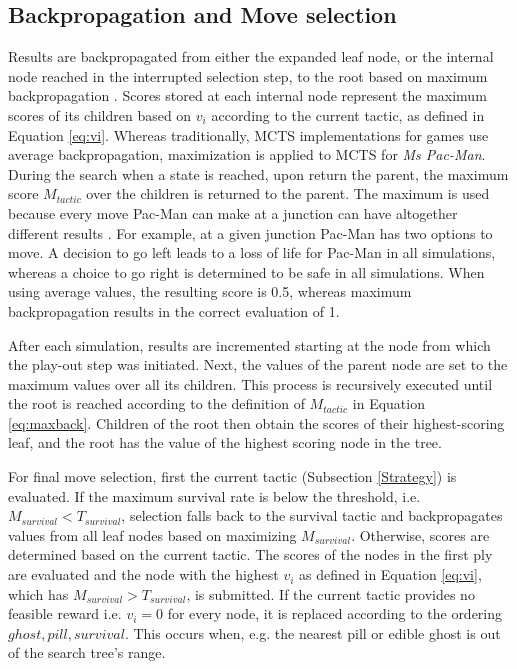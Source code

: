 \documentclass[journal]{IEEEtran}
\begin{document}
\subsection{Backpropagation and Move selection \label{sec:bpms}}

Results are backpropagated from either the expanded leaf node, or the internal node reached in the interrupted selection step, to the root based on maximum backpropagation \cite{coulom2007efficient}. Scores stored at each internal node represent the maximum scores of its children based on $v_i$ according to the current tactic, as defined in Equation \ref{eq:vi}. Whereas traditionally, MCTS implementations for games use average backpropagation, maximization is applied to MCTS for {\it{Ms Pac-Man}}. During the search when a state is reached, upon return the parent, the maximum score $M_{tactic}$ over the children is returned to the parent. The maximum is used because every move Pac-Man can make at a junction can have altogether different results \cite{ikehata2011monte}. For example, at a given junction Pac-Man has two options to move. A decision to go left leads to a loss of life for Pac-Man in all simulations, whereas a choice to go right is determined to be safe in all simulations. When using average values, the resulting score is 0.5, whereas maximum backpropagation results in the correct evaluation of 1. 

After each simulation, results are incremented starting at the node from which the play-out step was initiated. Next, the values of the parent node are set to the maximum values over all its children. This process is recursively executed until the root is reached according to the definition of $M_{tactic}$ in Equation \ref{eq:maxback}. Children of the root then obtain the scores of their highest-scoring leaf, and the root has the value of the highest scoring node in the tree.

For final move selection, first the current tactic (Subsection \ref{Strategy}) is evaluated. If the maximum survival rate is below the threshold, i.e. ${M}_{survival} < T_{survival}$, selection falls back to the survival tactic and backpropagates values from all leaf nodes based on maximizing ${M}_{survival}$. Otherwise, scores are determined based on the current tactic. The scores of the nodes in the first ply are evaluated and the node with the highest $v_i$ as defined in Equation \ref{eq:vi}, which has ${M}_{survival} > T_{survival}$, is submitted. If the current tactic provides no feasible reward i.e. $v_i = 0$ for every node, it is replaced according to the ordering $ghost, pill, survival$. This occurs when, e.g. the nearest pill or edible ghost is out of the search tree's range.
\end{document}
